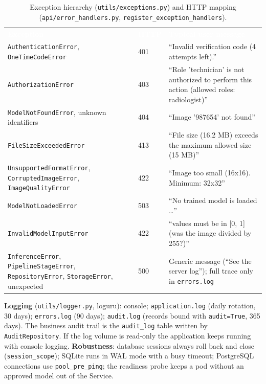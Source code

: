 \documentclass[12pt,a4paper]{article}
\newcommand{\fp}[1]{\nolinkurl{#1}}
\newcommand{\hd}[1]{\textcolor{white}{\textbf{#1}}}
\begin{document}
\begin{table}[H]
\centering
\caption{Exception hierarchy (\fp{utils/exceptions.py}) and HTTP mapping (\fp{api/error_handlers.py}, \fp{register_exception_handlers}).}
\label{tab:errors}
\renewcommand{\arraystretch}{1.2}
\begin{tabularx}{\textwidth}{L{5.2cm} C{1.2cm} Y}
\hd{Exception} & \hd{HTTP} & \hd{Typical user message} \\
\fp{AuthenticationError}, \texttt{OneTimeCodeError} & 401 & ``Invalid verification code (4 attempts left).'' \\
\fp{AuthorizationError} & 403 & ``Role 'technician' is not authorized to perform this action (allowed roles: radiologist)'' \\
\fp{ModelNotFoundError}, unknown identifiers & 404 & ``Image '987654' not found'' \\
\fp{FileSizeExceededError} & 413 & ``File size (16.2 MB) exceeds the maximum allowed size (15 MB)'' \\
\fp{UnsupportedFormatError}, \fp{CorruptedImageError}, \texttt{ImageQualityError} & 422 & ``Image too small (16x16). Minimum: 32x32'' \\
\fp{ModelNotLoadedError} & 503 & ``No trained model is loaded \ldots'' \\
\texttt{InvalidModelInputError} & 422 & ``values must be in [0, 1] (was the image divided by 255?)'' \\
\texttt{InferenceError}, \texttt{PipelineStageError}, \texttt{RepositoryError}, \texttt{StorageError}, unexpected & 500 & Generic message (``See the server log''); full trace only in \texttt{errors.log} \\
\end{tabularx}
\end{table}

\noindent \textbf{Logging} (\texttt{utils/logger.py}, loguru): console; \texttt{application.log} (daily
rotation, 30 days); \texttt{errors.log} (90 days); \texttt{audit.log} (records bound with
\texttt{audit=True}, 365 days). The business audit trail is the \texttt{audit\_log} table written by
\texttt{AuditRepository}. If the log volume is read-only the application keeps running with console
logging. \textbf{Robustness}: database sessions always roll back and close
(\texttt{session\_scope}); SQLite runs in WAL mode with a busy timeout; PostgreSQL connections use
\texttt{pool\_pre\_ping}; the readiness probe keeps a pod without an approved model out of the Service.
\end{document}
